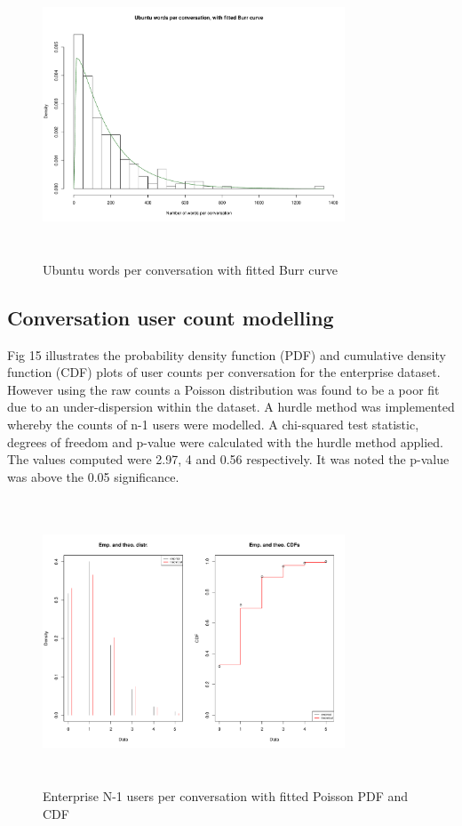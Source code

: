 \documentclass[conference]{IEEEtran}
\begin{document}
\begin{figure}
\begin{center}
\includegraphics[height=8.5cm, width=9cm]{14_words_ubuntu.pdf} 
\caption{Ubuntu words per conversation with fitted Burr curve}
\end{center}
\label{fig:interarrival_ubun}
\end{figure}


\subsection{Conversation user count modelling}

Fig 15 illustrates the probability density function (PDF) and cumulative density function (CDF) plots of user counts per conversation for the enterprise dataset. However using the raw counts a Poisson distribution was found to be a poor fit due to an under-dispersion within the dataset. A hurdle method was implemented whereby the counts of n-1 users were modelled. A chi-squared test statistic, degrees of freedom and p-value were calculated with the hurdle method applied. The values computed were 2.97, 4 and 0.56 respectively. It was noted the p-value was above the 0.05 significance.


\begin{figure}
\begin{center}
\includegraphics[height=8.5cm, width=9cm]{15_users_enterprise.pdf} 
\caption{Enterprise N-1 users per conversation with fitted Poisson PDF and CDF}
\end{center}
\label{fig:interarrival_ent}
\end{figure}
\end{document}
